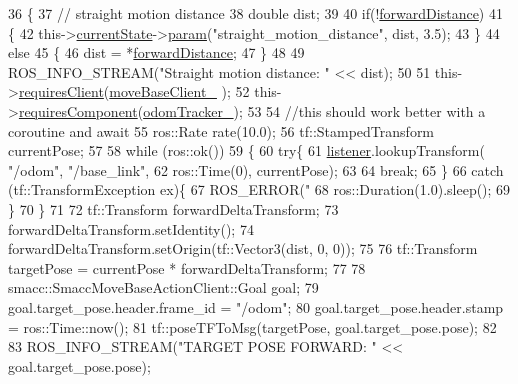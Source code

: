 \begin{DoxyCode}
36   \{
37     \textcolor{comment}{// straight motion distance}
38     \textcolor{keywordtype}{double} dist;
39 
40     \textcolor{keywordflow}{if}(!\hyperlink{classNavigateForward_ad2b2157f0a2c94fd9e1f11ae22d203fc}{forwardDistance})
41     \{
42       this->\hyperlink{classsmacc_1_1SmaccSubStateBehavior_a62e2b9da4a446f09396d0b4c01659b88}{currentState}->\hyperlink{classsmacc_1_1ISmaccState_a4982f2187ed6da337462721146e8ef70}{param}(\textcolor{stringliteral}{"straight\_motion\_distance"}, dist, 3.5);
43     \}
44     \textcolor{keywordflow}{else}
45     \{
46       dist = *\hyperlink{classNavigateForward_ad2b2157f0a2c94fd9e1f11ae22d203fc}{forwardDistance};
47     \}
48         
49     ROS\_INFO\_STREAM(\textcolor{stringliteral}{"Straight motion distance: "} << dist);
50 
51     this->\hyperlink{classsmacc_1_1SmaccSubStateBehavior_ae8361a9e794b02f9f3d962b881e4fd7d}{requiresClient}(\hyperlink{classNavigateForward_adeec3efc00297e64467a83d5ef82c44c}{moveBaseClient\_} );
52     this->\hyperlink{classsmacc_1_1SmaccSubStateBehavior_a9f31f62f886cc06017e92fa0d834b12d}{requiresComponent}(\hyperlink{classNavigateForward_a1805443ef8d8fe292af6bde6298e43c9}{odomTracker\_});
53 
54     \textcolor{comment}{//this should work better with a coroutine and await}
55     ros::Rate rate(10.0);
56     tf::StampedTransform currentPose;
57 
58     \textcolor{keywordflow}{while} (ros::ok())
59     \{
60         \textcolor{keywordflow}{try}\{
61         \hyperlink{classNavigateForward_a40927a8ea2a861c7bb3ece9256600552}{listener}.lookupTransform( \textcolor{stringliteral}{"/odom"},  \textcolor{stringliteral}{"/base\_link"},
62                                 ros::Time(0), currentPose);
63 
64          \textcolor{keywordflow}{break};
65         \}
66         \textcolor{keywordflow}{catch} (tf::TransformException ex)\{
67         ROS\_ERROR(\textcolor{stringliteral}{"%
68         ros::Duration(1.0).sleep();
69         \}
70     \}   
71 
72     tf::Transform forwardDeltaTransform;
73     forwardDeltaTransform.setIdentity();
74     forwardDeltaTransform.setOrigin(tf::Vector3(dist, 0, 0));
75 
76     tf::Transform targetPose =  currentPose * forwardDeltaTransform;
77     
78     smacc::SmaccMoveBaseActionClient::Goal goal;
79     goal.target\_pose.header.frame\_id = \textcolor{stringliteral}{"/odom"};
80     goal.target\_pose.header.stamp = ros::Time::now();
81     tf::poseTFToMsg(targetPose, goal.target\_pose.pose);
82     
83     ROS\_INFO\_STREAM(\textcolor{stringliteral}{"TARGET POSE FORWARD: "} << goal.target\_pose.pose);
}
\end{DoxyCode}
